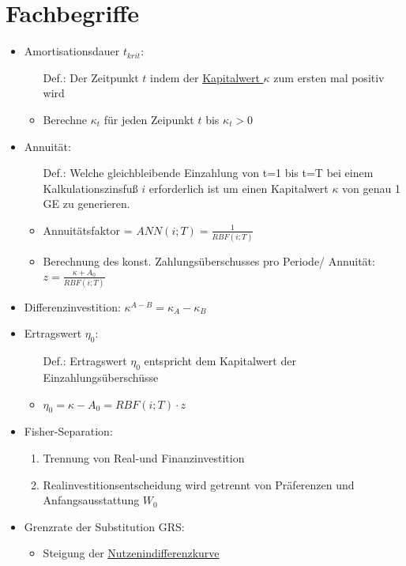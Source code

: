 \section{Fachbegriffe}
	\begin{itemize}
		\item Amortisationsdauer $t_{krit}$: \label{Amortisationsdauer}
			\begin{itemize}
				\item[Def.:] Der Zeitpunkt $t$ indem der \hyperref[Kapitalwert]{Kapitalwert $\kappa$} zum ersten mal positiv wird
				\item Berechne $\kappa_t$ für jeden Zeipunkt $t$ bis $\kappa_t >0$
			\end{itemize}
		\item Annuität:\label{Annuitaet}
			\begin{itemize}
				\item[Def.:] Welche gleichbleibende Einzahlung von t=1 bis t=T bei einem Kalkulationszinsfuß $i$ erforderlich ist um einen Kapitalwert $\kappa$ von genau 1 GE zu generieren.
				\item Annuitätsfaktor = $ANN(i;T)=\frac{1}{\hyperref[Rentenbarwertfaktor]{RBF(i;T)}}$ 
				\item Berechnung des konst. Zahlungsüberschusses pro Periode/ Annuität: $z=\frac{\kappa + A_0}{RBF(i;T)}$
			\end{itemize}
		\item Differenzinvestition\label{Differenzinvestition}: $\kappa^{A-B}=\kappa_A - \kappa_B$
			\item Ertragswert $\eta_0$:
			\begin{itemize}
				\item[Def.:] Ertragswert $\eta_0$ entspricht dem Kapitalwert der Einzahlungsüberschüsse
				\item $\eta_0=\kappa-A_0 = RBF(i;T)\cdot z $
			\end{itemize}
		\item Fisher-Separation\label{Fisher-Separation}:\\
			\begin{enumerate}
				\item Trennung von Real-und Finanzinvestition
				\item Realinvestitionsentscheidung wird getrennt von Präferenzen und Anfangsausstattung $W_0$
			\end{enumerate}
		\item Grenzrate der Substitution GRS: \label{GRS}
			\begin{itemize}
				\item Steigung der \hyperref[Nutzenindifferenzkurve]{Nutzenindifferenzkurve}

\end{itemize}
\end{itemize}
